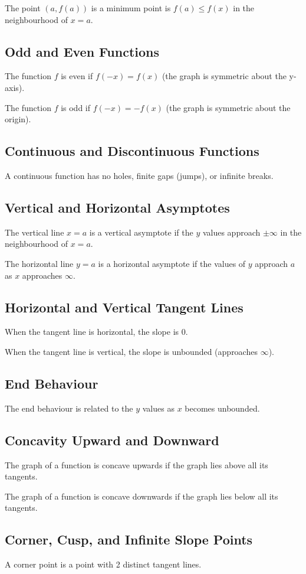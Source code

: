 			The point $(a, f(a))$ is a minimum point is $f(a) \leq f(x)$ in the neighbourhood of $x=a$.
		\subsection{Odd and Even Functions}
			The function $f$ is even if $f(-x) = f(x)$ (the graph is symmetric about the y-axis).

			The function $f$ is odd if $f(-x) = -f(x)$ (the graph is symmetric about the origin).
		\subsection{Continuous and Discontinuous Functions}
			\label{subsec:continuous}
			A continuous function has no holes, finite gaps (jumps), or infinite breaks.
		\subsection{Vertical and Horizontal Asymptotes}
			The vertical line $x=a$ is a vertical asymptote if the $y$ values approach $\pm\infty$ in the neighbourhood of $x=a$.

			The horizontal line $y=a$ is a horizontal asymptote if the values of $y$ approach $a$ as $x$ approaches $\infty$.
		\subsection{Horizontal and Vertical Tangent Lines}
			When the tangent line is horizontal, the slope is 0.

			When the tangent line is vertical, the slope is unbounded (approaches $\infty$).
		\subsection{End Behaviour}
			The end behaviour is related to the $y$ values as $x$ becomes unbounded.
		\subsection{Concavity Upward and Downward}
			The graph of a function is concave upwards if the graph lies above all its tangents.

			The graph of a function is concave downwards if the graph lies below all its tangents.
		\subsection{Corner, Cusp, and Infinite Slope Points}
			A corner point is a point with 2 distinct tangent lines.

